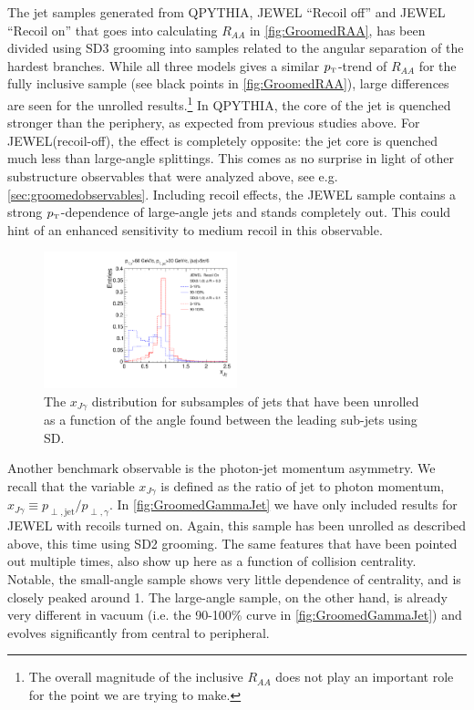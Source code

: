 The jet samples generated from QPYTHIA, JEWEL ``Recoil off'' and JEWEL ``Recoil on'' that goes into calculating $R_{AA}$ in \autoref{fig:GroomedRAA}, has been divided using SD3 grooming into samples related to the angular separation of the hardest branches. While all three models gives a similar $p_{\text{\tiny T}}$-trend of $R_{AA}$ for the fully inclusive sample (see black points in \autoref{fig:GroomedRAA}), large differences are seen for the unrolled results.\footnote{The overall magnitude of the inclusive $R_{AA}$ does not play an important role for the point we are trying to make.} In QPYTHIA, the core of the jet is quenched stronger than the periphery, as expected from previous studies above. For JEWEL(recoil-off), the effect is completely opposite: the jet core is quenched much less than large-angle splittings. This comes as no surprise in light  of other substructure observables that were analyzed above, see e.g. \autoref{sec:groomedobservables}. Including recoil effects, the JEWEL sample contains a strong $p_{\text{\tiny T}}$-dependence of large-angle jets and stands completely out. This could hint of an enhanced sensitivity to medium recoil in this observable.

\begin{figure}[th]
\centering
\includegraphics[width=0.5\textwidth]
{figures/Observables_GammaJet/JEWEL-photon-jet-recoilOn-linear}%
\caption{The $x_{J\gamma}$ distribution for subsamples of jets that have been unrolled as a function of the angle found between the leading sub-jets using SD. }
\label{fig:GroomedGammaJet}
\end{figure}
Another benchmark observable is the photon-jet momentum asymmetry. We recall that the variable $x_{J\gamma}$ is defined as the ratio of jet to photon momentum, $x_{J\gamma} \equiv p_{\perp,\text{jet}}/p_{\perp,\gamma}$.
In \autoref{fig:GroomedGammaJet} we have only included results for JEWEL with recoils turned on. Again, this sample has been unrolled as described above, this time using SD2 grooming. The same features that have been pointed out multiple times, also show up here as a function of collision centrality. Notable, the small-angle sample shows very little dependence of centrality, and is closely peaked around 1. The large-angle sample, on the other hand, is already very different in vacuum (i.e. the 90-100\% curve in \autoref{fig:GroomedGammaJet}) and evolves significantly from central to peripheral. 

